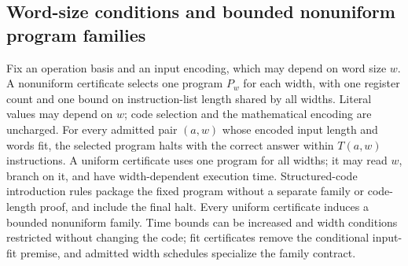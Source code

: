 \begin{result}
\subsection{Word-size conditions and bounded nonuniform program families}
Fix an operation basis and an input encoding, which may depend on word size $w$. A nonuniform
certificate selects one program $P_w$ for each width, with one register count and one bound on
instruction-list length shared by all widths. Literal values may depend on $w$; code selection
and the mathematical encoding are uncharged. For every admitted pair $(a,w)$ whose encoded
input length and words fit, the selected program halts with the correct answer within $T(a,w)$
instructions. A uniform certificate uses one program for all widths; it may read $w$, branch on
it, and have width-dependent execution time. Structured-code introduction rules package the
fixed program without a separate family or code-length proof, and include the final halt.
Every uniform certificate induces a bounded nonuniform family. Time bounds can be increased
and width conditions restricted without changing the code; fit certificates remove the
conditional input-fit premise, and admitted width schedules specialize the family contract.


\end{result}
